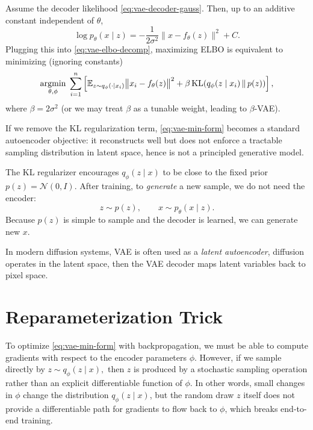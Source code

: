 \documentclass[../main]{subfiles}
\begin{document}
Assume the decoder likelihood \eqref{eq:vae-decoder-gauss}.  
Then, up to an additive constant independent of $\theta$,
\begin{equation}\label{eq:vae-loglik-mse}
    \log p_\theta(x\mid z)
    =
    -\frac{1}{2\sigma^2}\bigl\|x-f_\theta(z)\bigr\|^2 + C.
\end{equation}
Plugging this into \eqref{eq:vae-elbo-decomp}, maximizing ELBO is equivalent to
minimizing (ignoring constants)
\begin{equation}\label{eq:vae-min-form}
    \mathop{\mathrm{argmin}}_{\theta,\phi}\;
    \sum_{i=1}^n
    \left[
        \mathbb E_{z\sim q_\phi(\cdot\mid x_i)}
        \bigl\|x_i-f_\theta(z)\bigr\|^2
        +
        \beta\,
        \mathrm{KL}\!\left(q_\phi(z\mid x_i)\,\middle\|\,p(z)\right)
    \right],
\end{equation}
where $\beta=2\sigma^2$ (or we may treat $\beta$ as a tunable weight, leading to
\(\beta\)-VAE).

\begin{remark}
    If we remove the KL regularization term, \eqref{eq:vae-min-form} becomes a
    standard autoencoder objective: it reconstructs well but does not enforce a
    tractable sampling distribution in latent space, hence is not a principled
    generative model.
\end{remark}

The KL regularizer encourages $q_\phi(z\mid x)$ to be close to the fixed prior
$p(z)=\mathcal N(0,I)$.  
After training, to \emph{generate} a new sample, we do not need the encoder:
\begin{equation}
    z\sim p(z),\qquad x\sim p_\theta(x\mid z).
\end{equation}
Because $p(z)$ is simple to sample and the decoder is learned, we can generate
new $x$.

\begin{note}
    In modern diffusion systems, VAE is often used as a \emph{latent
    autoencoder}, diffusion operates in the latent space, then the VAE decoder
    maps latent variables back to pixel space.
\end{note}

\section{Reparameterization Trick}
To optimize \eqref{eq:vae-min-form} with backpropagation, we must be able to
compute gradients with respect to the encoder parameters $\phi$. However, if we
sample directly by $z\sim q_\phi(z\mid x),$
then $z$ is produced by a stochastic sampling operation rather than an explicit
differentiable function of $\phi$. In other words, small changes in $\phi$ change
the distribution $q_\phi(z\mid x)$, but the random draw $z$ itself does not provide
a differentiable path for gradients to flow back to $\phi$, which breaks
end-to-end training.
\end{document}
